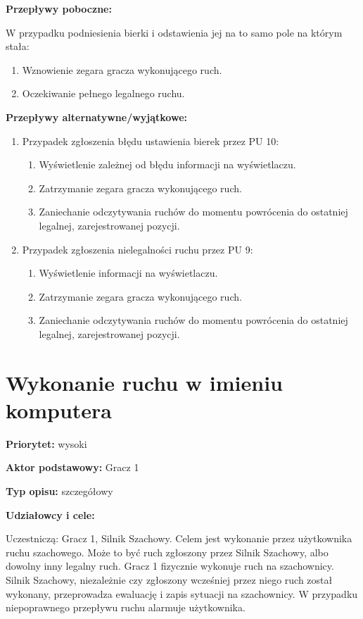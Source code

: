 \documentclass[12pt]{article}
\begin{document}
\textbf{Przepływy poboczne:}

W przypadku podniesienia bierki i odstawienia jej na to samo pole na którym stała:
\begin{enumerate}
\item Wznowienie zegara gracza wykonującego ruch.
\item Oczekiwanie pełnego legalnego ruchu.
\end{enumerate}

\textbf{Przepływy alternatywne/wyjątkowe:}
\begin{enumerate}

\item Przypadek zgłoszenia błędu ustawienia bierek przez PU 10:
\begin{enumerate}
\item Wyświetlenie zależnej od błędu informacji na wyświetlaczu.
\item Zatrzymanie zegara gracza wykonującego ruch.
\item Zaniechanie odczytywania ruchów do momentu powrócenia do ostatniej legalnej, zarejestrowanej pozycji.
\end{enumerate}

\item Przypadek zgłoszenia nielegalności ruchu przez PU 9:
\begin{enumerate}
\item Wyświetlenie informacji na wyświetlaczu.
\item Zatrzymanie zegara gracza wykonującego ruch.
\item Zaniechanie odczytywania ruchów do momentu powrócenia do ostatniej legalnej, zarejestrowanej pozycji.
\end{enumerate}
\end{enumerate}



\section{Wykonanie ruchu w imieniu komputera}

\textbf{Priorytet:} wysoki

\textbf{Aktor podstawowy:} Gracz 1

\textbf{Typ opisu:} szczegółowy

\textbf{Udziałowcy i cele:} 

Uczestniczą: Gracz 1, Silnik Szachowy. Celem jest wykonanie przez użytkownika ruchu szachowego. Może to być ruch zgłoszony przez Silnik Szachowy, albo dowolny inny legalny ruch. Gracz 1 fizycznie wykonuje ruch na szachownicy. Silnik Szachowy, niezależnie czy zgłoszony wcześniej przez niego ruch został wykonany, przeprowadza ewaluację i zapis sytuacji na szachownicy. W przypadku niepoprawnego przepływu ruchu alarmuje użytkownika. 
\end{document}
